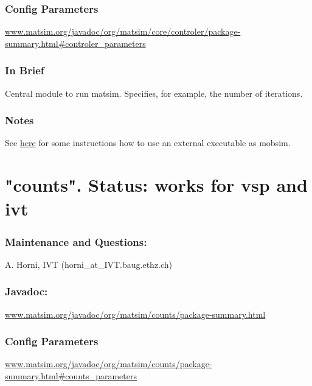 \subsubsection{Config Parameters}

\href{http://www.matsim.org/javadoc/org/matsim/core/controler/package-summary.html#controler_parameters}{www.matsim.org/javadoc/org/matsim/core/controler/package-summary.html\#controler\_parameters}


\subsubsection{\textbf{\textbf{In Brief}}}

Central module to run matsim. Specifies, for example, the number of iterations.



\subsubsection{Notes}

See \href{http://matsim.org/node/398}{here} for some instructions how to use an external executable as mobsim.

\vfill\eject
\section{"counts". Status: works for vsp and ivt}

\subsubsection{\textbf{Maintenance and Questions:}}

A. Horni, IVT (horni\_at\_IVT.baug.ethz.ch)

\subsubsection{\textbf{\textbf{Javadoc:
\\}}}

\href{http://www.matsim.org/javadoc/org/matsim/counts/package-summary.html}{www.matsim.org/javadoc/org/matsim/counts/package-summary.html}


\subsubsection{\textbf{\textbf{Config Parameters{}}}}

\href{http://www.matsim.org/javadoc/org/matsim/counts/package-summary.html#counts_parameters}{www.matsim.org/javadoc/org/matsim/counts/package-summary.html\#counts\_parameters}

